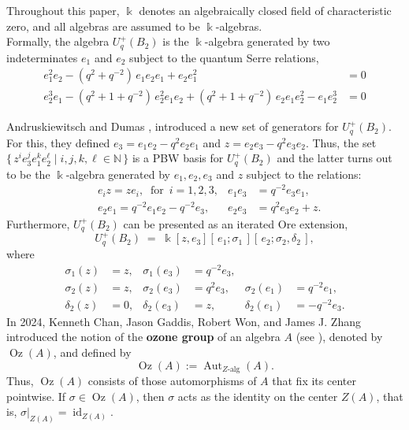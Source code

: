 \documentclass[11pt]{article}
\theoremstyle{definition}
\newcommand{\K}{\Bbbk}
\begin{document}
Throughout this paper, \(\K\) denotes an algebraically closed field of
characteristic zero, and all algebras are assumed to be
\(\K\)-algebras.\\

\noindent Formally, the algebra   \(U_q^{+}(B_2)\) is the \(\K\)-algebra generated by two indeterminates  $e_1$ and $e_2$ subject to the quantum Serre relations,
\begin{align*}
e_1^{2}e_2 - (q^{2}+q^{-2})\,e_1 e_2 e_1 + e_2 e_1^{2} &= 0\\
e_2^{3}e_1 - (q^{2}+1+q^{-2})\,e_2^{2} e_1 e_2 + (q^{2}+1+q^{-2})\,e_2 e_1 e_2^{2}   - e_1 e_2^{3} &= 0
\end{align*}

Andruskiewitsch and Dumas \cite[Section 3.1.2]{AndruskiewitschDumas2008},   introduced a new set of generators for
$U_q^{+}(B_2)$. For this, they defined
$e_{3}=e_{1}e_{2}-q^{2}e_{2}e_{1}
$ and $
z=e_{2}e_{3}-q^{2}e_{3}e_{2}$. Thus, the set 
\(\{\, z^{i} e_{3}^{j} e_{1}^{k} e_{2}^{\ell} \mid i,j,k,\ell \in \mathbb{N}\,\}\) 
is a PBW basis for $U_q^{+}(B_2)$  and the latter turns out to be  the \(\K\)-algebra generated by
\(e_1,e_2,e_3\) and \(z\) subject to the relations:
\begin{align*}
&e_i z = z e_i, \ \text{ for }\, i=1,2,3,
&e_1 e_3 &= q^{-2} e_3 e_1,\\
&e_2 e_1 = q^{-2} e_1 e_2 - q^{-2} e_3, &e_2 e_3 &= q^{2} e_3 e_2 + z.
\end{align*}
Furthermore, \(U_q^{+}(B_2)\) can be presented as an iterated Ore extension, 
\[
U_q^{+}(B_2) \;=\; \K[z,e_3][\,e_1;\sigma_1\,][\,e_2;\sigma_2,\delta_2\,],
\]
where
\begin{align*}
\sigma_1(z) &= z, 
& \sigma_1(e_3) &= q^{-2}e_3, \\[6pt]
\sigma_2(z) &= z, 
& \sigma_2(e_3) &= q^{2}e_3, 
& \sigma_2(e_1) &= q^{-2}e_1, \\[6pt]
\delta_2(z) &= 0, 
& \delta_2(e_3) &= z, 
& \delta_2(e_1) &= -q^{-2}e_3.
\end{align*}
In 2024, Kenneth Chan, Jason Gaddis, Robert Won, and James J. Zhang introduced the notion of the \textbf{ozone group} of an algebra \(A\) (see \cite{ChanGaddisWonZhang2024OzoneGroupsCenters}), denoted by \(\operatorname{Oz}(A)\), and defined by
$$
\operatorname{Oz}(A):=\operatorname{Aut}_{Z\text{-alg}}(A).
$$
\noindent Thus, \(\operatorname{Oz}(A)\) consists of those automorphisms of \(A\) that fix its center pointwise.  If \(\sigma\in\operatorname{Oz}(A)\), then \(\sigma\) acts as the identity on the center \(Z(A)\), that is,
\(\left.\sigma\right|_{Z(A)}=\operatorname{id}_{Z(A)}\). \\
\end{document}
